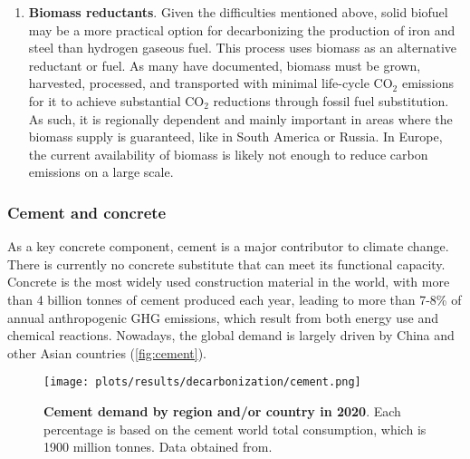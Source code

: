 \begin{enumerate}
\item \textbf{Biomass reductants}. Given the difficulties mentioned above, solid biofuel may be a more practical option for decarbonizing the production of iron and steel than hydrogen gaseous fuel.\autocite{fan2021low} This process uses biomass as an alternative reductant or fuel. As many have documented, biomass must be grown, harvested, processed, and transported with minimal life-cycle CO$_2$ emissions for it to achieve substantial CO$_2$ reductions through fossil fuel substitution.\autocite{langholtz20162016} As such, it is regionally dependent and mainly important in areas where the biomass supply is guaranteed, like in South America or Russia. In Europe, the current availability of biomass is likely not enough to reduce carbon emissions on a large scale.\autocite{hoffmann2021decarbonization}
\end{enumerate}


\subsubsection{Cement and concrete}
\label{sec:cement_and_concrete}

As a key concrete component, cement is a major contributor to climate change. There is currently no concrete substitute that can meet its functional capacity.\autocite{environment2018eco} Concrete is the most widely used construction material in the world, with more than 4 billion tonnes of cement produced each year, leading to more than 7-8\% of annual anthropogenic GHG emissions,\autocite{cement2021concrete} which result from both energy use and chemical reactions. Nowadays, the global demand is largely driven by China and other Asian countries\autocite{iea_2020} (\autoref{fig:cement}).

\begin{figure}[ht!]
  \centering
  \texttt{[image: plots/results/decarbonization/cement.png]}
  \caption[Cement demand by region and/or country in 2020]{\textbf{Cement demand by region and/or country in 2020}. Each percentage is based on the cement world total consumption, which is 1900 million tonnes. Data obtained from.\autocite{iea_2020}}
  \label{fig:cement}
\end{figure}

